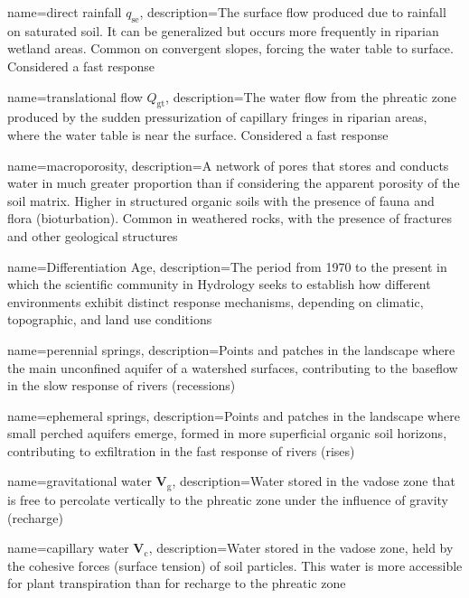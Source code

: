 {
    name=direct rainfall $q_{\text{se}}$,
    description={The surface flow produced due to rainfall on saturated soil. It can be generalized but occurs more frequently in riparian wetland areas. Common on convergent slopes, forcing the water table to surface. Considered a fast response}
}

{
    name=translational flow $Q_{\text{gt}}$,
    description={The water flow from the phreatic zone produced by the sudden pressurization of capillary fringes in riparian areas, where the water table is near the surface. Considered a fast response}
}

{
    name=macroporosity,
    description={A network of pores that stores and conducts water in much greater proportion than if considering the apparent porosity of the soil matrix. Higher in structured organic soils with the presence of fauna and flora (bioturbation). Common in weathered rocks, with the presence of fractures and other geological structures}
}

{
    name=Differentiation Age,
    description={The period from 1970 to the present in which the scientific community in Hydrology seeks to establish how different environments exhibit distinct response mechanisms, depending on climatic, topographic, and land use conditions}
}

{
    name=perennial springs,
    description={Points and patches in the landscape where the main unconfined aquifer of a watershed surfaces, contributing to the baseflow in the slow response of rivers (recessions)}
}

{
    name=ephemeral springs,
    description={Points and patches in the landscape where small perched aquifers emerge, formed in more superficial organic soil horizons, contributing to exfiltration in the fast response of rivers (rises)}
}

{
    name=gravitational water $\textbf{V}_{\text{g}}$,
    description={Water stored in the vadose zone that is free to percolate vertically to the phreatic zone under the influence of gravity (recharge)}
}

{
    name=capillary water $\textbf{V}_{\text{c}}$,
    description={Water stored in the vadose zone, held by the cohesive forces (surface tension) of soil particles. This water is more accessible for plant transpiration than for recharge to the phreatic zone}
}


